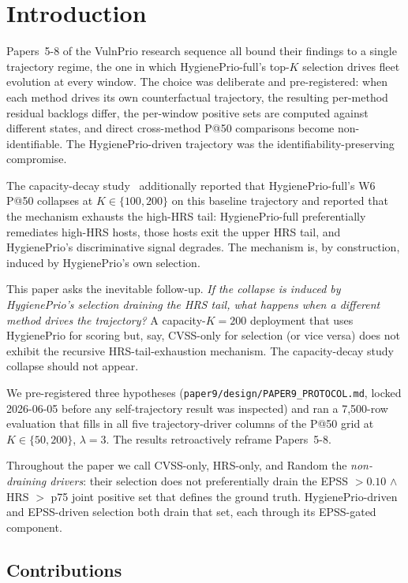 \section{Introduction}

Papers~5-8 of the VulnPrio research sequence all bound their findings
to a single trajectory regime, the one in which HygienePrio-full's
top-$K$ selection drives fleet evolution at every window. The choice was
deliberate and pre-registered: when each method drives its own
counterfactual trajectory, the resulting per-method residual backlogs
differ, the per-window positive sets are computed against different
states, and direct cross-method P@50 comparisons become
non-identifiable. The HygienePrio-driven trajectory was the
identifiability-preserving compromise.

The capacity-decay study~\cite{paper6capacity} additionally reported that HygienePrio-full's
W6 P@50 collapses at $K \in \{100, 200\}$ on this baseline trajectory and
reported that the mechanism exhausts the high-HRS tail: HygienePrio-full
preferentially remediates high-HRS hosts, those hosts exit the upper
HRS tail, and HygienePrio's discriminative signal degrades. The
mechanism is, by construction, induced by HygienePrio's own selection.

This paper asks the inevitable follow-up. \textit{If the collapse is
induced by HygienePrio's selection draining the HRS tail, what happens
when a different method drives the trajectory?} A capacity-$K = 200$
deployment that uses HygienePrio for scoring but, say, CVSS-only for
selection (or vice versa) does not exhibit the recursive
HRS-tail-exhaustion mechanism. The capacity-decay study collapse should not appear.

We pre-registered three hypotheses
(\texttt{paper9/design/PAPER9\_PROTOCOL.md}, locked 2026-06-05 before
any self-trajectory result was inspected) and ran a 7{,}500-row
evaluation that fills in all five trajectory-driver columns of the
P@50 grid at $K \in \{50, 200\}$, $\lambda = 3$. The results retroactively
reframe Papers~5-8.

Throughout the paper we call CVSS-only, HRS-only, and Random the
\emph{non-draining drivers}: their selection does not preferentially
drain the EPSS $> 0.10$ $\wedge$ HRS $>$ p75 joint positive set that
defines the ground truth. HygienePrio-driven and EPSS-driven selection
both drain that set, each through its EPSS-gated component.

\subsection{Contributions}

